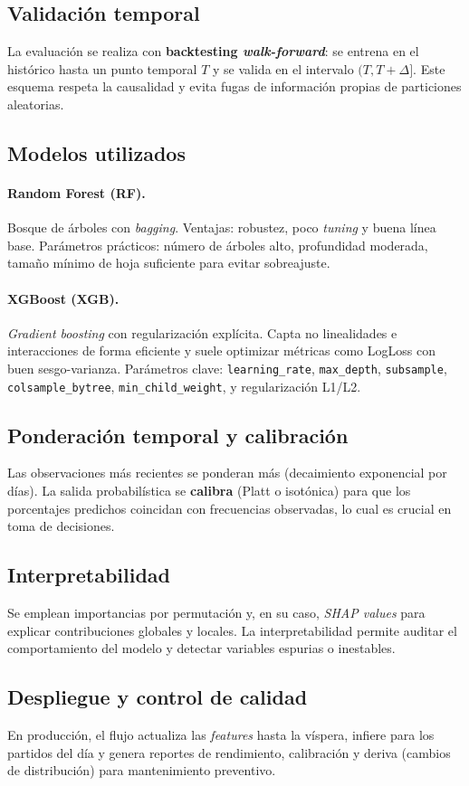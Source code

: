 \subsection*{Validación temporal}
La evaluación se realiza con \textbf{backtesting \textit{walk-forward}}: se entrena en el histórico hasta un punto temporal $T$ y se valida en el intervalo $(T, T+\Delta]$.
Este esquema respeta la causalidad y evita fugas de información propias de particiones aleatorias.

\subsection*{Modelos utilizados}
\paragraph{Random Forest (RF).}
Bosque de árboles con \textit{bagging}. Ventajas: robustez, poco \textit{tuning} y buena línea base.
Parámetros prácticos: número de árboles alto, profundidad moderada, tamaño mínimo de hoja suficiente para evitar sobreajuste.

\paragraph{XGBoost (XGB).}
\textit{Gradient boosting} con regularización explícita.
Capta no linealidades e interacciones de forma eficiente y suele optimizar métricas como LogLoss con buen sesgo-varianza.
Parámetros clave: \texttt{learning\_rate}, \texttt{max\_depth}, \texttt{subsample}, \texttt{colsample\_bytree}, \texttt{min\_child\_weight}, y regularización L1/L2.

\subsection*{Ponderación temporal y calibración}
Las observaciones más recientes se ponderan más (decaimiento exponencial por días).
La salida probabilística se \textbf{calibra} (Platt o isotónica) para que los porcentajes predichos coincidan con frecuencias observadas,
lo cual es crucial en toma de decisiones.

\subsection*{Interpretabilidad}
Se emplean importancias por permutación y, en su caso, \textit{SHAP values} para explicar contribuciones globales y locales.
La interpretabilidad permite auditar el comportamiento del modelo y detectar variables espurias o inestables.

\subsection*{Despliegue y control de calidad}
En producción, el flujo actualiza las \textit{features} hasta la víspera, infiere para los partidos del día y genera reportes de rendimiento,
calibración y deriva (cambios de distribución) para mantenimiento preventivo.
